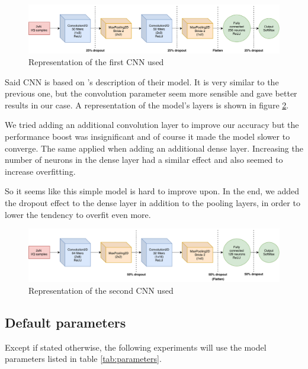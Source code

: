 \begin{figure}[htbp!]
  \centering
  \includegraphics[scale=0.63]{figures/ml_riyaz.pdf}
  \caption{Representation of the first CNN used}
  \label{fig:cnn-riyaz}
\end{figure}

Said CNN is based on \textcite{youssef_machine_2017}'s description of their model. It is very similar to the previous one, but the convolution parameter seem more sensible and gave better results in our case. A representation of the model's layers is shown in figure \ref{fig:cnn-youssef}.

We tried adding an additional convolution layer to improve our accuracy but the performance boost was insignificant and of course it made the model slower to converge. The same applied when adding an additional dense layer. Increasing the number of neurons in the dense layer had a similar effect and also seemed to increase overfitting.

So it seems like this simple model is hard to improve upon. In the end, we added the dropout effect to the dense layer in addition to the pooling layers, in order to lower the tendency to overfit even more.

\begin{figure}[htbp!]
  \centering
  \includegraphics[scale=0.63]{figures/ml_youssef.pdf}
  \caption{Representation of the second CNN used}
  \label{fig:cnn-youssef}
\end{figure}

\subsection{Default parameters}

Except if stated otherwise, the following experiments will use the model parameters listed in table \ref{tab:parameters}.

